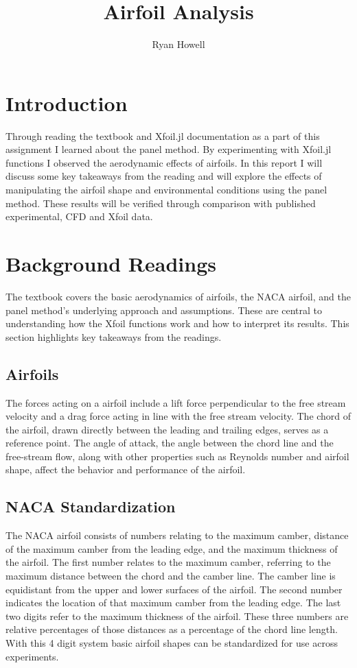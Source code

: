 \documentclass{article}
\title{Airfoil Analysis}
\author{Ryan Howell}
\begin{document}
\maketitle



\section{Introduction}

Through reading the textbook and Xfoil.jl documentation as a part of this assignment I learned about the panel method. By experimenting with Xfoil.jl functions I observed the aerodynamic effects of airfoils. In this report I will discuss some key takeaways from the reading and will explore the effects of manipulating the airfoil shape and environmental conditions using the panel method. These results will be verified through comparison with published experimental, CFD and Xfoil data.

\section{Background Readings}
The textbook covers the basic aerodynamics of airfoils, the NACA airfoil, and the panel method's underlying approach and assumptions. These are central to understanding how the Xfoil functions work and how to interpret its results. This section highlights key takeaways from the readings.
\subsection{Airfoils}
The forces acting on a airfoil include a lift force perpendicular to the free stream velocity and a drag force acting in line with the free stream velocity. The chord of the airfoil, drawn directly between the leading and trailing edges, serves as a reference point. The angle of attack, the angle between the chord line and the free-stream flow, along with other properties such as Reynolds number and airfoil shape, affect the behavior and performance of the airfoil.
\subsection{NACA Standardization}
The NACA airfoil consists of numbers relating to the maximum camber, distance of the maximum camber from the leading edge, and the maximum thickness of the airfoil. 
The first number relates to the maximum camber, referring to the maximum distance between the chord and the camber line. The camber line is equidistant from the upper and lower surfaces of the airfoil. The second number indicates the location of that maximum camber from the leading edge. The last two digits refer to the maximum thickness of the airfoil. These three numbers are relative percentages of those distances as a percentage of the chord line length. With this 4 digit system basic airfoil shapes can be standardized for use across experiments.
\end{document}
